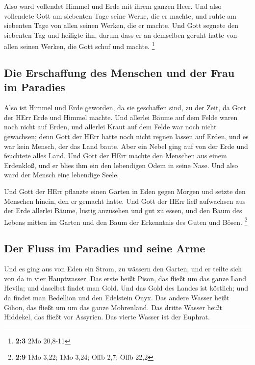  Also ward vollendet Himmel und Erde mit ihrem ganzen
Heer.  Und also vollendete Gott am siebenten Tage seine
Werke, die er machte, und ruhte am siebenten Tage von allen seinen
Werken, die er machte.  Und Gott segnete den siebenten Tag
und heiligte ihn, darum dass er an demselben geruht hatte von allen
seinen Werken, die Gott schuf und machte. \footnote{\textbf{2:3} 2Mo
  20,8-11}

\hypertarget{die-erschaffung-des-menschen-und-der-frau-im-paradies}{%
\subsection{Die Erschaffung des Menschen und der Frau im
Paradies}\label{die-erschaffung-des-menschen-und-der-frau-im-paradies}}

 Also ist Himmel und Erde geworden, da sie geschaffen
sind, zu der Zeit, da Gott der HErr Erde und Himmel machte.
 Und allerlei Bäume auf dem Felde waren noch nicht auf
Erden, und allerlei Kraut auf dem Felde war noch nicht gewachsen; denn
Gott der HErr hatte noch nicht regnen lassen auf Erden, und es war kein
Mensch, der das Land baute.  Aber ein Nebel ging auf von
der Erde und feuchtete alles Land.  Und Gott der HErr
machte den Menschen aus einem Erdenkloß, und er blies ihm ein den
lebendigen Odem in seine Nase. Und also ward der Mensch eine lebendige
Seele.

 Und Gott der HErr pflanzte einen Garten in Eden gegen
Morgen und setzte den Menschen hinein, den er gemacht hatte.
 Und Gott der HErr ließ aufwachsen aus der Erde allerlei
Bäume, lustig anzusehen und gut zu essen, und den Baum des Lebens mitten
im Garten und den Baum der Erkenntnis des Guten und Bösen. \footnote{\textbf{2:9}
  1Mo 3,22; 1Mo 3,24; Offb 2,7; Offb 22,2}

\hypertarget{der-fluss-im-paradies-und-seine-arme}{%
\subsection{Der Fluss im Paradies und seine
Arme}\label{der-fluss-im-paradies-und-seine-arme}}

 Und es ging aus von Eden ein Strom, zu wässern den
Garten, und er teilte sich von da in vier Hauptwasser. 
Das erste heißt Pison, das fließt um das ganze Land Hevila; und daselbst
findet man Gold.  Und das Gold des Landes ist köstlich;
und da findet man Bedellion und den Edelstein Onyx.  Das
andere Wasser heißt Gihon, das fließt um um das ganze Mohrenland.
 Das dritte Wasser heißt Hiddekel, das fließt vor
Assyrien. Das vierte Wasser ist der Euphrat.

